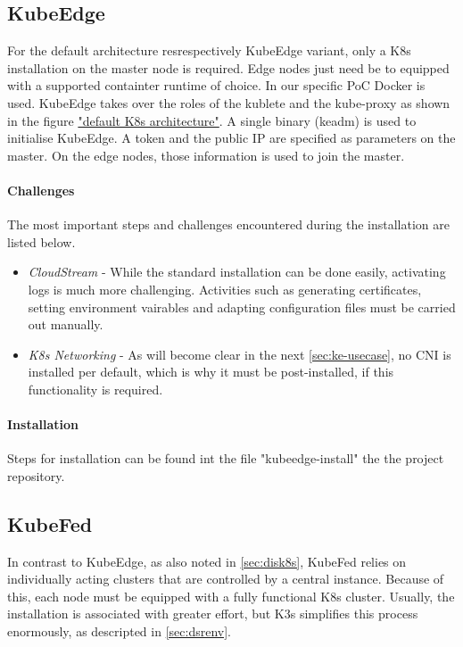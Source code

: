 \documentclass[MSC,Master,english]{twbook}%
\begin{document}
\subsection{KubeEdge}
\label{sec:dsrenvke}
For the default architecture resrespectively KubeEdge variant, only a \ac{K8s} installation on the master node is required. Edge nodes just need be to equipped with a supported containter runtime of choice. In our specific \ac{PoC} Docker is used. KubeEdge takes over the roles of the kublete and the kube-proxy as shown in the figure \hyperref[fig:k8s-default]{"default K8s architecture"}. A single binary (keadm) is used to initialise KubeEdge. A token and the public IP are specified as parameters on the master. On the edge nodes, those information is used to join the master. 

\paragraph{Challenges} The most important steps and challenges encountered during the installation are listed below.

\begin{itemize}
    \item \textit{CloudStream} - While the standard installation can be done easily, activating logs is much more challenging. Activities such as generating certificates, setting environment vairables and adapting configuration files must be carried out manually.
    \item \textit{K8s Networking} - As will become clear in the next \autoref{sec:ke-usecase}, no \ac{CNI} is installed per default, which is why it must be post-installed, if this functionality is required. 
\end{itemize}

\paragraph{Installation} Steps for installation can be found int the file "kubeedge-install"\cite{bk-gh-ke-install} the the project repository.

\subsection{KubeFed}
\label{sec:dsrenvkf}
In contrast to KubeEdge, as also noted in \autoref{sec:disk8s}, KubeFed relies on individually acting clusters that are controlled by a central instance. Because of this, each node must be equipped with a fully functional \ac{K8s} cluster. Usually, the installation is associated with greater effort, but K3s simplifies this process enormously, as descripted in \autoref{sec:dsrenv}. 
\end{document}
